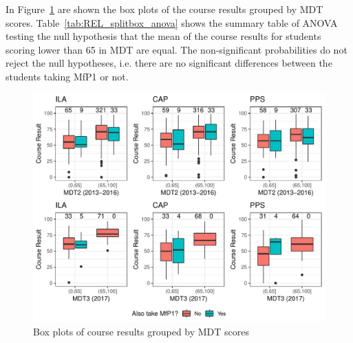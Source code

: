 \documentclass[a4paper]{report}
\begin{document}
In Figure~\ref{fig:REL_splitbox} are shown the box plots of the course results grouped by MDT scores. Table~\ref{tab:REL_splitbox_anova} shows the summary table of ANOVA testing the null hypothesis that the mean of the course results for students scoring lower than 65 in MDT are equal. The non-significant probabilities do not reject the null hypotheses, i.e. there are no significant differences between the students taking MfP1 or not. 

\begin{figure}[H]
  \centering
  \includegraphics[width=\linewidth]{fig/REL_splitbox.pdf}
  \caption{\label{fig:REL_splitbox}Box plots of course results grouped by MDT scores}
\end{figure}
\end{document}
